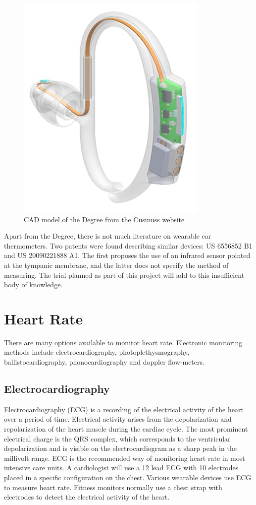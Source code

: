 \begin{figure}[h]
   \centering
   \includegraphics[scale=0.5]{figs/Degree}
   \caption{CAD model of the Degree from the Cusinuss website \citep{CosinussDegree}}
   \label{fig:Degree}
\end{figure}

Apart from the Degree, there is not much literature on wearable ear thermometers. Two patents were found describing similar devices: US 6556852 B1 and US 20090221888 A1. The first proposes the use of an infrared sensor pointed at the tympanic membrane, and the latter does not specify the method of measuring. The trial planned as part of this project will add to this insufficient body of knowledge.

\section{Heart Rate}
There are many options available to monitor heart rate. Electronic monitoring methods include electrocardiography, photoplethysmography, ballistocardiography, phonocardiography and doppler flow-meters.

\subsection{Electrocardiography}
Electrocardiography (ECG) is a recording of the electrical activity of the heart over a period of time. Electrical activity arises from the depolarization and repolarization of the heart muscle during the cardiac cycle. The most prominent electrical charge is the QRS complex, which corresponds to the ventricular depolarization and is visible on the electrocardiogram as a sharp peak in the millivolt range. ECG is the recommended way of monitoring heart rate in most intensive care units. A cardiologist will use a 12 lead ECG with 10 electrodes placed in a specific configuration on the chest. Various wearable devices use ECG to measure heart rate. Fitness monitors normally use a chest strap with electrodes to detect the electrical activity of the heart.

